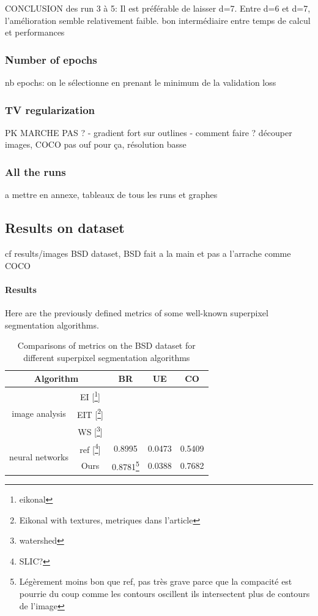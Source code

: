 \documentclass{article}
\begin{document}
        CONCLUSION des run 3 à 5: Il est préférable de laisser d=7. Entre d=6 et d=7, l'amélioration semble
        relativement faible.
        bon intermédiaire entre temps de calcul et performances

        \subsubsection{Number of epochs}
        nb epochs: on le sélectionne en prenant le minimum de la validation loss
        \subsubsection{TV regularization}
        PK MARCHE PAS ?
        - gradient fort sur outlines
        - comment faire ? découper images, COCO pas ouf pour ça, résolution basse
        \subsubsection{All the runs}
        a mettre en annexe, tableaux de tous les runs et graphes

    \subsection{Results on dataset}
    cf results/images
    BSD dataset, BSD fait a la main et pas a l'arrache comme COCO

        \paragraph{Results}
        Here are the previously defined metrics of some well-known superpixel segmentation algorithms.
        \begin{table}[!ht]
            \centering
            \begin{tabular}{|c|c|ccc|}
                \hline
                \multicolumn{2}{|c|}{Algorithm} & BR & UE & CO\\
                \hline
                \hline
                \multirow{3}{*}{image analysis} & EI [\footnote{eikonal}] & & & \\
                & EIT [\footnote{Eikonal with textures, metriques dans l'article}] & & & \\
                & WS [\footnote{watershed}] & & & \\
                \hline
                \multirow{2}{*}{neural networks} & ref [\footnote{SLIC?}] & 0.8995 & 0.0473 & 0.5409\\
                & Ours & 0.8781\footnote{Légèrement moins bon que ref, pas très grave parce que la compacité est pourrie du coup comme les contours oscillent ils intersectent plus de contours de l'image} & 0.0388 & 0.7682\\
                \hline
            \end{tabular}
            \caption{Comparisons of metrics on the BSD dataset for different
            superpixel segmentation algorithms}
        \end{table}
\end{document}
